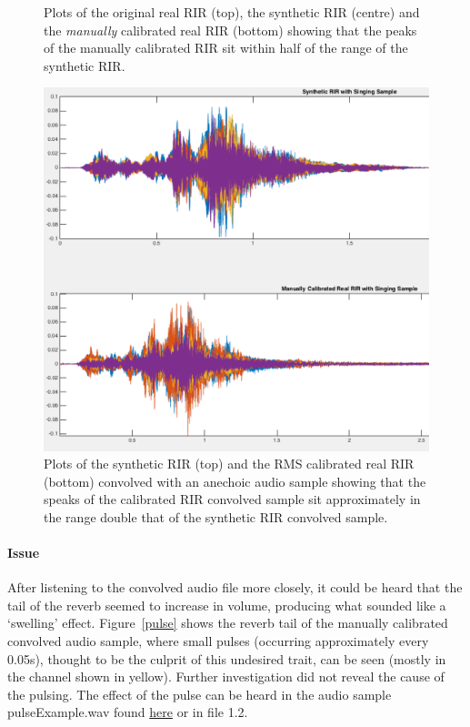 \documentclass[../../main.tex]{subfiles}
\begin{document}
\begin{figure}[H]
\begin{center}
					\caption{Plots of the original real \ac{RIR} (top), the synthetic \ac{RIR} (centre) and the \textit{manually} calibrated real \ac{RIR} (bottom) showing that the peaks of the manually calibrated \ac{RIR} sit within half of the range of the synthetic \ac{RIR}.}
					\label{calMan}
				\end{center}
			\end{figure}

			\begin{figure}[H]
				\begin{center}
					\includegraphics[scale = 0.3]{Sections/Implementation/RealRIRs/images/calibration/CalMan_Sing_edit.png} 
					\caption{Plots of the synthetic \ac{RIR} (top) and the RMS calibrated real \ac{RIR} (bottom) convolved with an anechoic audio sample showing that the speaks of the calibrated \ac{RIR} convolved sample sit approximately in the range double that of the synthetic \ac{RIR} convolved sample.}
					\label{calMansing}
				\end{center}
			\end{figure}

		\paragraph{Issue}
			After listening to the convolved audio file more closely, it could be heard that the tail of the reverb seemed to increase in volume, producing what sounded like a `swelling' effect. Figure~\ref{pulse} shows the reverb tail of the manually calibrated convolved audio sample, where small pulses (occurring approximately every 0.05s), thought to be the culprit of this undesired trait, can be seen (mostly in the channel shown in yellow). Further investigation did not reveal the cause of the pulsing. The effect of the pulse can be heard in the audio sample pulseExample.wav found \href{http://lt669.github.io/pages/audioSamples.html}{here} or in file 1.2.
\end{document}
